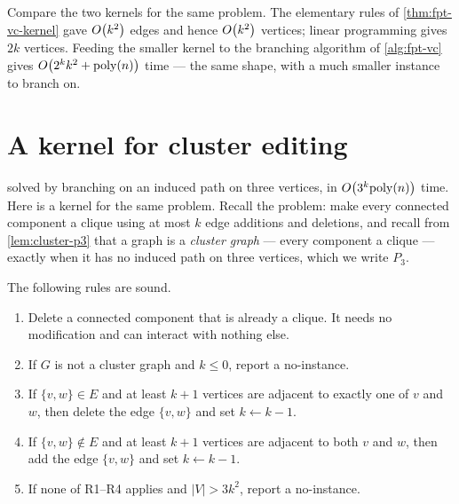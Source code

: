 Compare the two kernels for the same problem. The elementary rules of
\cref{thm:fpt-vc-kernel} gave $O\!\left(k^2\right)$ edges and hence $O\!\left(k^2\right)$
vertices; linear programming gives $2k$ vertices. Feeding the smaller kernel to
the branching algorithm of \cref{alg:fpt-vc} gives
$O\!\left(2^k k^2 + \mathrm{poly}(n)\right)$ time --- the same shape, with a much smaller
instance to branch on.

\section{A kernel for cluster editing}
\label{sec:cluster-editing-kernel}

 solved  by branching on an induced path
on three vertices, in $O\!\left(3^k \mathrm{poly}(n)\right)$ time. Here is a kernel for the
same problem. Recall the problem: make every connected component a clique using
at most $k$ edge additions and deletions, and recall from
\cref{lem:cluster-p3} that a graph is a \emph{cluster graph} --- every component
a clique --- exactly when it has no induced path on three vertices, which we
write $P_3$.

\begin{observation}\label{obs:cluster-rules}
The following rules are sound.
\begin{enumerate}[label=\textbf{R\arabic*.},leftmargin=*]
  \item Delete a connected component that is already a clique. It needs no
        modification and can interact with nothing else.
  \item If $G$ is not a cluster graph and $k \le 0$, report a no-instance.
  \item If $\{v,w\} \in E$ and at least $k+1$ vertices are adjacent to exactly
        one of $v$ and $w$, then delete the edge $\{v,w\}$ and set
        $k \gets k-1$.
  \item If $\{v,w\} \notin E$ and at least $k+1$ vertices are adjacent to both
        $v$ and $w$, then add the edge $\{v,w\}$ and set $k \gets k-1$.
  \item If none of R1--R4 applies and $|V| > 3k^2$, report a no-instance.
\end{enumerate}
\end{observation}


